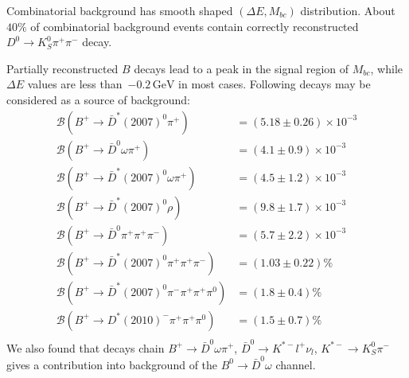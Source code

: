 \documentclass[preprint,aps,showpacs]{revtex4}
\newcommand{\dnkpp}{\ensuremath{D^0\to K^0_S\pi^+\pi^-}\xspace}
\newcommand{\bdomega}{\ensuremath{B^0\to \bar D^0\omega}\xspace}
\newcommand{\de}{\ensuremath{\Delta E}\xspace}
\newcommand{\mbc}{\ensuremath{M_{bc}}\xspace}
\begin{document}
Combinatorial background has smooth shaped $(\de,\mbc)$ distribution. About $40\%$ of combinatorial background events contain correctly reconstructed \dnkpp decay.

Partially reconstructed $B$ decays lead to a peak in the signal region of \mbc, while \de values are less than~$-0.2\,\text{GeV}$ in most cases. %
Following decays may be considered as a source of background:
\begin{equation}\label{eq:peaking_bkg_modes}
\begin{split}
 \mathcal{B}(B^+\to \bar D^*(2007)^0\pi^+) &= (5.18\pm0.26)\times 10^{-3}\\
 \mathcal{B}(B^+\to \bar D^0\omega\pi^+) &= (4.1\pm0.9)\times 10^{-3}\\
 \mathcal{B}(B^+\to \bar D^*(2007)^0\omega\pi^+) &= (4.5\pm1.2)\times 10^{-3}\\
 \mathcal{B}(B^+\to \bar D^*(2007)^0\rho) &= (9.8\pm1.7)\times 10^{-3}\\
 \mathcal{B}(B^+\to \bar D^0\pi^+\pi^+\pi^-) &= (5.7\pm2.2)\times 10^{-3}\\
 \mathcal{B}(B^+\to \bar D^*(2007)^0\pi^+\pi^+\pi^-) &= (1.03\pm0.22)\% \\
 \mathcal{B}(B^+\to \bar D^*(2007)^0\pi^-\pi^+\pi^+\pi^0) &= (1.8\pm0.4)\% \\
 \mathcal{B}(B^+\to D^*(2010)^-\pi^+\pi^+\pi^0) &= (1.5\pm0.7)\% \\
\end{split}
\end{equation}
We also found that decays chain $B^+\to \bar D^0\omega\pi^+$, $\bar D^0\to K^{*-}l^+\nu_l$, $K^{*-}\to K_S^0\pi^-$ gives a contribution into background of the \bdomega channel.
\end{document}
